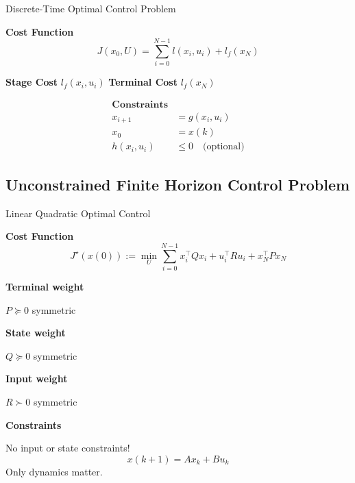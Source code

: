
\begin{sstTitleBox}{
    Discrete-Time Optimal Control Problem
  }
  \begin{sstOnlyFrame}
    \textbf{Cost Function}
    \vspace{-3mm}
    \begin{equation}
      J(x_0,U)= \sum_{i=0}^{N-1} l(x_i,u_i) + l_f(x_N)
    \end{equation}
    \begin{minipage}[t]{0.25\linewidth}
      \textbf{Stage Cost}
      $l_f(x_i,u_i)$
      \textbf{Terminal Cost}
      $l_f(x_N)$
    \end{minipage}
    \begin{minipage}[t]{0.59\linewidth}
      \vspace{-5.5mm}
      \begin{align*}
        \textbf{Constraints}                      \\
        x_{i+1}    & = g(x_i,u_i)                 \\
        x_0        & = x(k)                       \\
        h(x_i,u_i) & \le 0 \quad\text{(optional)}
      \end{align*}
    \end{minipage}
  \end{sstOnlyFrame}
\end{sstTitleBox}

\subsection{Unconstrained Finite Horizon Control Problem}

\begin{sstTitleBox}
  {Linear Quadratic Optimal Control}
  \begin{sstOnlyFrame}
    \textbf{Cost Function}
    \vspace{-3mm}
    \begin{equation}
      J^\star(x(0)) := \min_U
      \sum_{i=0}^{N-1}
      x_i^\top Q x_i + u_i^\top R u_i
      +x_N^\top P x_N
      \label{oc:lq-oc}
    \end{equation}

    \vspace{-2mm}
    \begin{minipage}[t]{0.33\linewidth}
      \textbf{Terminal weight}

      $P\succeq0$ symmetric

      \textbf{State weight}

      $Q\succeq0$ symmetric

      \textbf{Input weight}

      $R\succ0$ symmetric
    \end{minipage}
    \begin{minipage}[t]{0.49\linewidth}
      \textbf{Constraints}

      No input or state constraints!
      \[
        x(k+1)=Ax_k+Bu_k
      \]
      Only dynamics matter.
    \end{minipage}

  \end{sstOnlyFrame}
\end{sstTitleBox}

